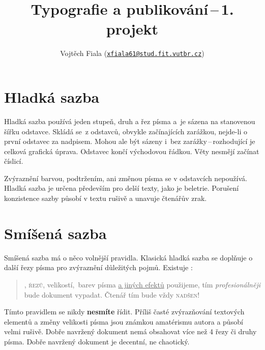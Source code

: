 \documentclass[a4paper, 10pt, twocolumn]{article}
\begin{document}
    \title{Typografie a publikování\,--\,1. projekt\medskip}
    \author{Vojtěch Fiala (\href{mailto:xfiala61@stud.fit.vutbr.cz}{\texttt{xfiala61@stud.fit.vutbr.cz}})}
    \date{}
    \maketitle

    \section{Hladká sazba}

        Hladká sazba používá jeden stupeň, druh a řez písma a~je sázena na stanovenou šířku odstavce. Skládá se~z odstavců, obvykle začínajících zarážkou, nejde-li o první odstavec za nadpisem. Mohou ale být sázeny i~bez zarážky\,--\,rozhodující je celková grafická úprava. Odstavec končí východovou řádkou. Věty nesmějí začínat číslicí.    

        Zvýraznění barvou, podtržením, ani změnou písma se v odstavcích nepoužívá. Hladká sazba je určena především pro delší texty, jako je beletrie. Porušení konzistence sazby působí v textu rušivě a unavuje čtenářův zrak.
        
    \section{Smíšená sazba}
    
        Smíšená sazba má o něco volnější pravidla. Klasická hladká sazba se doplňuje o další řezy písma pro zvýraznění důležitých pojmů. Existuje :
        
        \begin{quotation}

            {\selectfont {Čím více druhů}}, \textsc{řezů}, {\tiny{velikostí}}, \,barev písma \underline{a jiných efektů} použijeme, tím \emph{\large{profe\-sionálněji}} bude dokument vypadat. Čtenář tím bude vždy \textsc{nadšen}!

        \end{quotation}

        {\footnotesize{Tímto}} pravidlem se nikdy \textbf{nesmíte} řídit. Příliš časté {\large{zvýrazňování}} textových elementů a změny velikosti {\huge{písma}} jsou známkou amatérismu autora a působí {\Huge{velmi}} rušivě. Dobře navržený dokument nemá obsahovat více než
        4 řezy či druhy písma. Dobře navržený dokument je decentní, ne chaotický.
\end{document}

